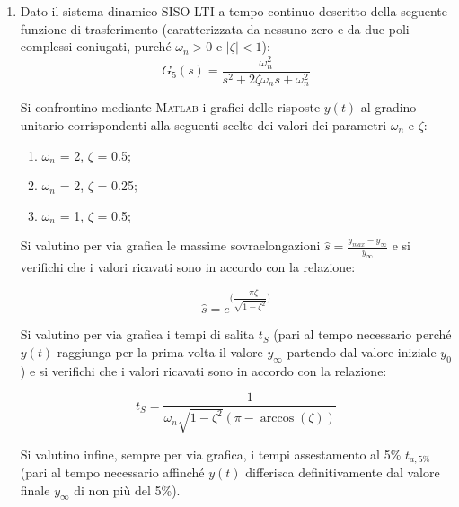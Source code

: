 \documentclass[../main.tex]{subfiles}
\begin{document}
\begin{enumerate}
		Si determinino per via grafica i tempi di salita $t_S$ (pari al tempo necessario affinché $y(t)$ passi per la prima volta dal 10\% al 90\% del valore finale $y+\infty$).
		
	\item Dato il sistema dinamico SISO LTI a tempo continuo descritto della seguente funzione di trasferimento (caratterizzata da nessuno zero e da due poli complessi coniugati, purché $\omega_n > 0$ e $|\zeta| < 1$):
		\begin{equation}
			G_5(s) = \frac{\omega_n^2}{s^2+2\zeta \omega_n s + \omega_n^2}
		\end{equation}
		
		Si confrontino mediante \textsc{Matlab} i grafici delle risposte $y(t)$ al gradino unitario corrispondenti alla seguenti scelte dei valori dei parametri $\omega_n$ e $\zeta$:
		\begin{enumerate}
			\item $\omega_n$ = 2, $\zeta$ = 0.5;
			\item $\omega_n$ = 2, $\zeta$ = 0.25;
			\item $\omega_n$ = 1, $\zeta$ = 0.5;
		\end{enumerate}		
		
		Si valutino per via grafica le massime sovraelongazioni $\hat s = \frac{y_{max} - y_{\infty}}{y_\infty}$ e si verifichi che i valori ricavati sono in accordo con la relazione:
		
		\begin{equation}
			\hat s = e^{\bigg(\dfrac{-\pi \zeta}{\sqrt{1 - \zeta ^2}}\bigg)}
		\end{equation}
		
		Si valutino per via grafica i tempi di salita $t_S$ (pari al tempo necessario perché $y(t)$ raggiunga per la prima volta il valore $y_\infty$ partendo dal valore iniziale $y_0$) e si verifichi che i valori ricavati sono in accordo con la relazione:
		
		\begin{equation}
			t_S = \frac{1}{\omega_n \sqrt{1 - \zeta^2} (\pi - \arccos(\zeta))}
		\end{equation}		
		
		Si valutino infine, sempre per via grafica, i tempi assestamento al 5\% $t_{a,5\%}$ (pari al tempo necessario affinché $y(t)$ differisca definitivamente dal valore finale $y_\infty$ di non più del 5\%).
		
\end{enumerate}
\end{document}
